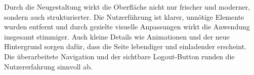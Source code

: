 Durch die Neugestaltung wirkt die Oberfläche nicht nur frischer und moderner, sondern auch strukturierter.
Die Nutzerführung ist klarer, unnötige Elemente wurden entfernt und durch gezielte visuelle Anpassungen wirkt die Anwendung insgesamt stimmiger. Auch kleine Details wie Animationen und der neue Hintergrund sorgen dafür, dass die Seite lebendiger und einladender erscheint.
Die überarbeitete Navigation und der sichtbare Logout-Button runden die Nutzererfahrung sinnvoll ab.